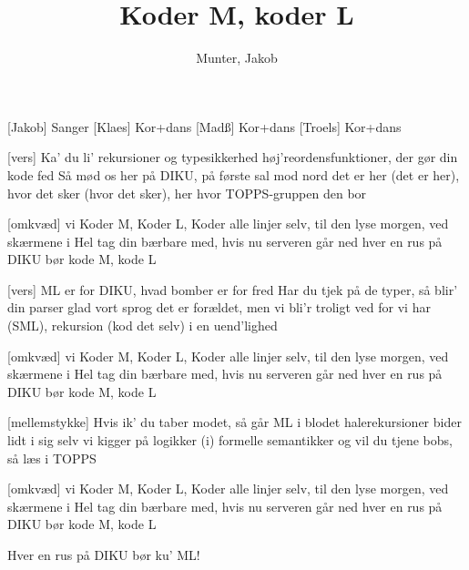 \documentclass[a4paper,11pt]{article}
\title{Koder M, koder L}
\author{Munter, Jakob}
\begin{document}
\maketitle

\begin{roles}  
[Jakob] Sanger
[Klaes] Kor+dans
[Madß] Kor+dans
[Troels] Kor+dans
\end{roles}

\begin{song}
[vers] Ka' du li' rekursioner og typesikkerhed
høj'reordensfunktioner, der gør din kode fed
Så mød os her på DIKU, på første sal mod nord
det er her (det er her), hvor det sker (hvor det sker),
her hvor TOPPS-gruppen den bor

[omkvæd] vi Koder M, Koder L,
Koder alle linjer selv,
til den lyse morgen,
ved skærmene i Hel
tag din bærbare med,
hvis nu serveren går ned
hver en rus på DIKU
bør kode M, kode L

[vers] ML er for DIKU, hvad bomber er for fred
Har du tjek på de typer, så blir' din parser glad
vort sprog det er forældet, men vi bli'r troligt ved
for vi har (SML), rekursion (kod det selv)
i en uend'lighed

[omkvæd] vi Koder M, Koder L,
Koder alle linjer selv,
til den lyse morgen,
ved skærmene i Hel
tag din bærbare med,
hvis nu serveren går ned
hver en rus på DIKU
bør kode M, kode L

[mellemstykke] Hvis ik' du taber modet, så går ML i blodet
halerekursioner bider lidt i sig selv
vi kigger på logikker (i) formelle semantikker
og vil du tjene bobs, så læs i TOPPS


[omkvæd] vi Koder M, Koder L,
Koder alle linjer selv,
til den lyse morgen,
ved skærmene i Hel
tag din bærbare med,
hvis nu serveren går ned
hver en rus på DIKU
bør kode M, kode L

Hver en rus på DIKU
bør ku' ML!

\end{song}
\end{document}
